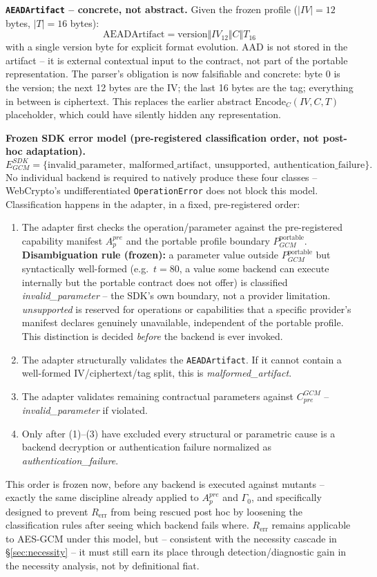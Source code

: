 \documentclass[11pt,a4paper]{article}
\begin{document}
\textbf{\texttt{AEADArtifact} -- concrete, not abstract.} Given the frozen profile ($|IV|=12$ bytes, $|T|=16$ bytes):
\[\text{AEADArtifact} = \text{version} \Vert IV_{12} \Vert C \Vert T_{16}\]
with a single version byte for explicit format evolution. AAD is not stored in the artifact -- it is external contextual input to the contract, not part of the portable representation. The parser's obligation is now falsifiable and concrete: byte 0 is the version; the next 12 bytes are the IV; the last 16 bytes are the tag; everything in between is ciphertext. This replaces the earlier abstract $\text{Encode}_C(IV,C,T)$ placeholder, which could have silently hidden any representation.

\textbf{Frozen SDK error model (pre-registered classification order, not post-hoc adaptation).}
\[E_{GCM}^{SDK} = \{\text{invalid\_parameter},\ \text{malformed\_artifact},\ \text{unsupported},\ \text{authentication\_failure}\}.\]
No individual backend is required to natively produce these four classes -- WebCrypto's undifferentiated \texttt{OperationError} does not block this model. Classification happens in the adapter, in a fixed, pre-registered order:
\begin{enumerate}
\item The adapter first checks the operation/parameter against the pre-registered capability manifest $A_p^{pre}$ and the portable profile boundary $P_{GCM}^{\text{portable}}$. \textbf{Disambiguation rule (frozen):} a parameter value outside $P_{GCM}^{\text{portable}}$ but syntactically well-formed (e.g.\ $t=80$, a value some backend can execute internally but the portable contract does not offer) is classified \emph{invalid\_parameter} -- the SDK's own boundary, not a provider limitation. \emph{unsupported} is reserved for operations or capabilities that a specific provider's manifest declares genuinely unavailable, independent of the portable profile. This distinction is decided \emph{before} the backend is ever invoked.
\item The adapter structurally validates the \texttt{AEADArtifact}. If it cannot contain a well-formed IV/ciphertext/tag split, this is \emph{malformed\_artifact}.
\item The adapter validates remaining contractual parameters against $C_{pre}^{GCM}$ -- \emph{invalid\_parameter} if violated.
\item Only after (1)--(3) have excluded every structural or parametric cause is a backend decryption or authentication failure normalized as \emph{authentication\_failure}.
\end{enumerate}
This order is frozen now, before any backend is executed against mutants -- exactly the same discipline already applied to $A_p^{pre}$ and $\Gamma_0$, and specifically designed to prevent $R_{\text{err}}$ from being rescued post hoc by loosening the classification rules after seeing which backend fails where. $R_{\text{err}}$ remains applicable to AES-GCM under this model, but -- consistent with the necessity cascade in \S\ref{sec:necessity} -- it must still earn its place through detection/diagnostic gain in the necessity analysis, not by definitional fiat.
\end{document}
